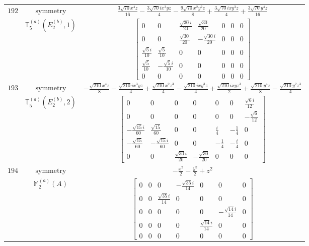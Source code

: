 \documentclass[fleqn,8pt,landscape]{jsarticle}
\begin{document}
\begin{longtable}{ccc}
$ 192 $ & $ \text{symmetry} $ & $ \frac{3 \sqrt{70} x^{4} z}{16} - \frac{3 \sqrt{70} i x^{3} y z}{4} - \frac{9 \sqrt{70} x^{2} y^{2} z}{8} + \frac{3 \sqrt{70} i x y^{3} z}{4} + \frac{3 \sqrt{70} y^{4} z}{16} $ \\
$  $ & $ \mathbb{T}_{5}^{(a)}(E_{2}^{(b)},1) $ & $ \begin{bmatrix} 0 & 0 & \frac{\sqrt{30} i}{20} & \frac{\sqrt{30}}{20} & 0 & 0 & 0 \\ 0 & 0 & \frac{\sqrt{30}}{20} & - \frac{\sqrt{30} i}{20} & 0 & 0 & 0 \\ \frac{\sqrt{5} i}{10} & \frac{\sqrt{5}}{10} & 0 & 0 & 0 & 0 & 0 \\ \frac{\sqrt{5}}{10} & - \frac{\sqrt{5} i}{10} & 0 & 0 & 0 & 0 & 0 \\ 0 & 0 & 0 & 0 & 0 & 0 & 0 \end{bmatrix} $ \\ \hline
$ 193 $ & $ \text{symmetry} $ & $ - \frac{\sqrt{210} x^{4} z}{8} - \frac{\sqrt{210} i x^{3} y z}{4} + \frac{\sqrt{210} x^{2} z^{3}}{4} - \frac{\sqrt{210} i x y^{3} z}{4} + \frac{\sqrt{210} i x y z^{3}}{2} + \frac{\sqrt{210} y^{4} z}{8} - \frac{\sqrt{210} y^{2} z^{3}}{4} $ \\
$  $ & $ \mathbb{T}_{5}^{(a)}(E_{2}^{(b)},2) $ & $ \begin{bmatrix} 0 & 0 & 0 & 0 & 0 & 0 & \frac{\sqrt{6} i}{12} \\ 0 & 0 & 0 & 0 & 0 & 0 & - \frac{\sqrt{6}}{12} \\ - \frac{\sqrt{15} i}{60} & \frac{\sqrt{15}}{60} & 0 & 0 & \frac{i}{4} & - \frac{1}{4} & 0 \\ - \frac{\sqrt{15}}{60} & - \frac{\sqrt{15} i}{60} & 0 & 0 & - \frac{1}{4} & - \frac{i}{4} & 0 \\ 0 & 0 & \frac{\sqrt{30} i}{20} & - \frac{\sqrt{30}}{20} & 0 & 0 & 0 \end{bmatrix} $ \\ \hline
$ 194 $ & $ \text{symmetry} $ & $ - \frac{x^{2}}{2} - \frac{y^{2}}{2} + z^{2} $ \\
$  $ & $ \mathbb{M}_{2}^{(a)}(A) $ & $ \begin{bmatrix} 0 & 0 & 0 & - \frac{\sqrt{35} i}{14} & 0 & 0 & 0 \\ 0 & 0 & \frac{\sqrt{35} i}{14} & 0 & 0 & 0 & 0 \\ 0 & 0 & 0 & 0 & 0 & - \frac{\sqrt{14} i}{14} & 0 \\ 0 & 0 & 0 & 0 & \frac{\sqrt{14} i}{14} & 0 & 0 \\ 0 & 0 & 0 & 0 & 0 & 0 & 0 \end{bmatrix} $ \\ \hline

\end{longtable}
\end{document}
